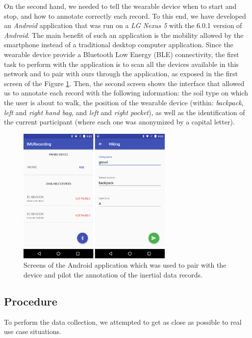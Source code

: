 \documentclass[conference]{IEEEtran}
\begin{document}
On the second hand, we needed to tell the wearable device when to start and stop, and how to annotate correctly each record. To this end, we have developed an \textit{Android} application \cite{Thullier2016b} that was run on a \textit{LG Nexus 5} with the 6.0.1 version of \textit{Android}. The main benefit of such an application is the mobility allowed by the smartphone instead of a traditional desktop computer application. Since the wearable device provide a Bluetooth Low Energy (BLE) connectivity, the first task to perform with the application is to scan all the devices available in this network and to pair with ours through the application, as exposed in the first screen of the Figure \ref{fig:android_app}. Then, the second screen shows the interface that allowed us to annotate each record with the following information: the soil type on which the user is about to walk, the position of the wearable device (within: \textit{backpack}, \textit{left} and \textit{right hand bag}, and \textit{left} and \textit{right pocket}), as well as the identification of the current participant (where each one was anonymized by a capital letter).

\begin{figure}[!t]
  \centering
  \includegraphics[width=3in]{android_app}
  \caption{Screens of the Android application which was used to pair with the device and pilot the annotation of the inertial data records.}
  \label{fig:android_app}
\end{figure}

\subsection{Procedure}

To perform the data collection, we attempted to get as close as possible to real use case situations. 
\end{document}
